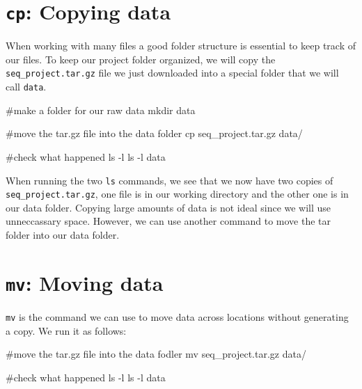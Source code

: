 \documentclass[
  letterpaper,
  DIV=11,
  numbers=noendperiod]{scrreprt}
\newenvironment{Shaded}{}{}
\newcommand{\AttributeTok}[1]{\textcolor[rgb]{0.84,0.23,0.29}{#1}}
\newcommand{\CommentTok}[1]{\textcolor[rgb]{0.42,0.45,0.49}{#1}}
\newcommand{\FunctionTok}[1]{\textcolor[rgb]{0.44,0.26,0.76}{#1}}
\newcommand{\NormalTok}[1]{\textcolor[rgb]{0.14,0.16,0.18}{#1}}
\begin{document}
\section{\texorpdfstring{\texttt{cp}: Copying
data}{cp: Copying data}}\label{cp-copying-data}

When working with many files a good folder structure is essential to
keep track of our files. To keep our project folder organized, we will
copy the \texttt{seq\_project.tar.gz} file we just downloaded into a
special folder that we will call \texttt{data}.

\begin{Shaded}
\begin{Highlighting}[]
\CommentTok{\#make a folder for our raw data}
\FunctionTok{mkdir}\NormalTok{ data}

\CommentTok{\#move the tar.gz file into the data folder }
\FunctionTok{cp}\NormalTok{ seq\_project.tar.gz data/}

\CommentTok{\#check what happened}
\FunctionTok{ls} \AttributeTok{{-}l}
\FunctionTok{ls} \AttributeTok{{-}l}\NormalTok{ data}
\end{Highlighting}
\end{Shaded}

When running the two \texttt{ls} commands, we see that we now have two
copies of \texttt{seq\_project.tar.gz}, one file is in our working
directory and the other one is in our data folder. Copying large amounts
of data is not ideal since we will use unneccassary space. However, we
can use another command to move the tar folder into our data folder.

\section{\texorpdfstring{\texttt{mv}: Moving
data}{mv: Moving data}}\label{mv-moving-data}

\texttt{mv} is the command we can use to move data across locations
without generating a copy. We run it as follows:

\begin{Shaded}
\begin{Highlighting}[]
\CommentTok{\#move the tar.gz file into the data fodler }
\FunctionTok{mv}\NormalTok{ seq\_project.tar.gz data/}

\CommentTok{\#check what happened}
\FunctionTok{ls} \AttributeTok{{-}l}
\FunctionTok{ls} \AttributeTok{{-}l}\NormalTok{ data}
\end{Highlighting}
\end{Shaded}
\end{document}
